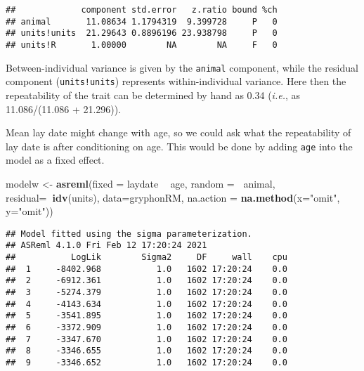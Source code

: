 \documentclass[12pt,]{book}
\newenvironment{Shaded}{\begin{snugshade}}{\end{snugshade}}
\newcommand{\DataTypeTok}[1]{\textcolor[rgb]{0.13,0.29,0.53}{#1}}
\newcommand{\KeywordTok}[1]{\textcolor[rgb]{0.13,0.29,0.53}{\textbf{#1}}}
\newcommand{\NormalTok}[1]{#1}
\newcommand{\OperatorTok}[1]{\textcolor[rgb]{0.81,0.36,0.00}{\textbf{#1}}}
\newcommand{\StringTok}[1]{\textcolor[rgb]{0.31,0.60,0.02}{#1}}
\begin{document}
\begin{Shaded}
\end{Shaded}

\begin{verbatim}
##             component std.error   z.ratio bound %ch
## animal       11.08634 1.1794319  9.399728     P   0
## units!units  21.29643 0.8896196 23.938798     P   0
## units!R       1.00000        NA        NA     F   0
\end{verbatim}

Between-individual variance is given by the \texttt{animal} component, while the residual component (\texttt{units!units}) represents within-individual variance. Here then the repeatability of the trait can be determined by hand as 0.34 (\emph{i.e.}, as 11.086/(11.086 + 21.296)).

Mean lay date might change with age, so we could ask what the repeatability of lay date is after conditioning on age. This would be done by adding \texttt{age} into the model as a fixed effect.

\begin{Shaded}
\begin{Highlighting}[]
\NormalTok{modelw <-}\StringTok{ }\KeywordTok{asreml}\NormalTok{(}\DataTypeTok{fixed =}\NormalTok{ laydate }\OperatorTok{~}\StringTok{ }\NormalTok{age,}
                 \DataTypeTok{random =}\OperatorTok{~}\StringTok{ }\NormalTok{animal,}
                 \DataTypeTok{residual=}\OperatorTok{~}\KeywordTok{idv}\NormalTok{(units),}
                 \DataTypeTok{data=}\NormalTok{gryphonRM,}
                 \DataTypeTok{na.action =} \KeywordTok{na.method}\NormalTok{(}\DataTypeTok{x=}\StringTok{"omit"}\NormalTok{, }\DataTypeTok{y=}\StringTok{"omit"}\NormalTok{))}
\end{Highlighting}
\end{Shaded}

\begin{verbatim}
## Model fitted using the sigma parameterization.
## ASReml 4.1.0 Fri Feb 12 17:20:24 2021
##           LogLik        Sigma2     DF     wall    cpu
##  1     -8402.968           1.0   1602 17:20:24    0.0
##  2     -6912.361           1.0   1602 17:20:24    0.0
##  3     -5274.379           1.0   1602 17:20:24    0.0
##  4     -4143.634           1.0   1602 17:20:24    0.0
##  5     -3541.895           1.0   1602 17:20:24    0.0
##  6     -3372.909           1.0   1602 17:20:24    0.0
##  7     -3347.670           1.0   1602 17:20:24    0.0
##  8     -3346.655           1.0   1602 17:20:24    0.0
##  9     -3346.652           1.0   1602 17:20:24    0.0
\end{verbatim}
\end{document}
